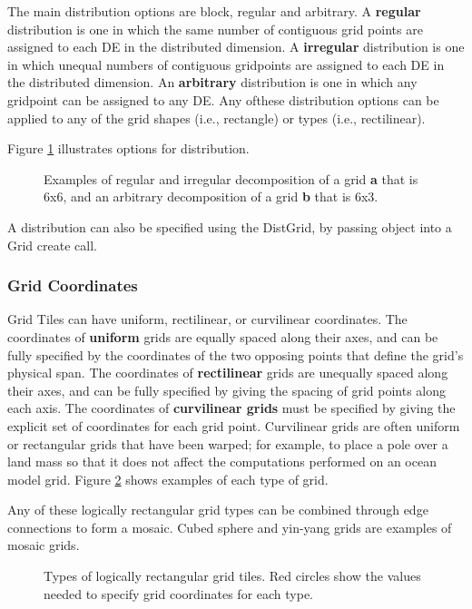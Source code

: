 The main distribution options are block, regular and arbitrary.
A {\bf regular} distribution is one in which the same number of
contiguous grid points are assigned to each DE in the
distributed dimension.  A {\bf irregular} distribution is one in which
unequal numbers of contiguous gridpoints are assigned to each
DE in the distributed dimension.  An {\bf arbitrary} distribution is
one in which any gridpoint can be assigned to any DE.  Any ofthese
distribution options can be applied to any of the grid shapes (i.e.,
rectangle) or types (i.e., rectilinear).

Figure \ref{fig:GridDecomps} illustrates options for distribution.
\begin{figure}
\caption{Examples of regular and irregular decomposition of
a grid {\bf a} that is 6x6, and an arbitrary decomposition of
a grid {\bf b} that is 6x3.}
\label{fig:GridDecomps}
\end{figure}

A distribution can also be specified using the DistGrid, by passing
object into a Grid create call.

\subsubsection{Grid Coordinates}
\label{sec:coordspec}
Grid Tiles can have uniform, rectilinear, or curvilinear
coordinates.  The coordinates of {\bf uniform} grids are equally spaced along
their axes, and can be fully specified by the coordinates of the two opposing points
that define the grid's physical span.  The coordinates of {\bf rectilinear} grids
are unequally spaced along their axes, and can be fully specified by giving
the spacing of grid points along each axis.  The coordinates of {\bf curvilinear 
grids} must be specified by giving the explicit set of coordinates for each
grid point.  Curvilinear grids are often uniform or rectangular grids that 
have been warped; for example, to place a pole over a land mass so that it
does not affect the computations performed on an ocean model grid.  Figure
\ref{fig:LogRectGrids} shows examples of each type of grid.

Any of these logically rectangular grid types can be combined through edge
connections to form a mosaic.  Cubed sphere and yin-yang grids are examples
of mosaic grids.
 
\begin{figure}
\caption{Types of logically rectangular grid tiles.  Red circles show the
values needed to specify grid coordinates for each type.}
\label{fig:LogRectGrids}
\end{figure}

